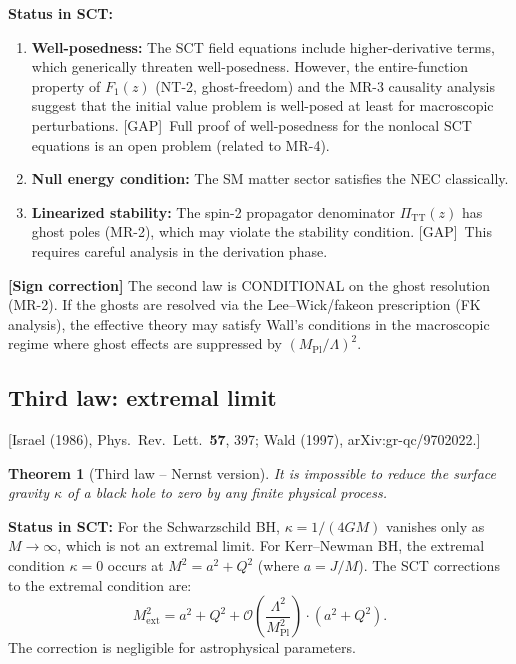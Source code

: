\documentclass[12pt,a4paper]{article}
\newtheorem{theorem}[proposition]{Theorem}
\theoremstyle{definition}
\theoremstyle{remark}
\newcommand{\fromlit}[1]{\textcolor{blue!70!black}{\textsf{[#1]}}}
\newcommand{\gap}{\textcolor{red!80!black}{\textsf{[GAP]}}}
\newcommand{\signcorrection}[1]{%
  \par\noindent\colorbox{red!10}{%
    \parbox{\dimexpr\linewidth-2\fboxsep}{%
      \textcolor{red!50!black}{\textbf{[Sign correction]}}
      \textcolor{red!50!black}{#1}%
    }%
  }\par%
}
\begin{document}
\textbf{Status in SCT:}
\begin{enumerate}[nosep]
  \item \textbf{Well-posedness:} The SCT field equations include
    higher-derivative terms, which generically threaten well-posedness.
    However, the entire-function property of $F_1(z)$
    (NT-2, ghost-freedom) and the MR-3 causality analysis suggest
    that the initial value problem is well-posed at least for
    macroscopic perturbations.  \gap\ Full proof of well-posedness
    for the nonlocal SCT equations is an open problem (related to MR-4).
  \item \textbf{Null energy condition:} The SM matter sector satisfies
    the NEC classically.
  \item \textbf{Linearized stability:} The spin-2 propagator
    denominator $\Pi_{\mathrm{TT}}(z)$ has ghost poles (MR-2),
    which may violate the stability condition.
    \gap\ This requires careful analysis in the derivation phase.
\end{enumerate}

\signcorrection{The second law is CONDITIONAL on the ghost resolution
(MR-2).  If the ghosts are resolved via the Lee--Wick/fakeon
prescription (FK analysis), the effective theory may satisfy Wall's
conditions in the macroscopic regime where ghost effects are
suppressed by $(M_{\mathrm{Pl}}/\Lambda)^2$.}

\subsection{Third law: extremal limit}
\fromlit{Israel (1986), Phys.\ Rev.\ Lett.~\textbf{57}, 397;
Wald (1997), arXiv:gr-qc/9702022.}

\begin{theorem}[Third law -- Nernst version]
It is impossible to reduce the surface gravity $\kappa$ of a black
hole to zero by any finite physical process.
\end{theorem}

\textbf{Status in SCT:} For the Schwarzschild BH, $\kappa = 1/(4GM)$
vanishes only as $M \to \infty$, which is not an extremal limit.
For Kerr--Newman BH, the extremal condition $\kappa = 0$ occurs at
$M^2 = a^2 + Q^2$ (where $a = J/M$).  The SCT corrections to the
extremal condition are:
\begin{equation}
  M_{\mathrm{ext}}^2 = a^2 + Q^2
  + \mathcal{O}\!\left(\frac{\Lambda^2}{M_{\mathrm{Pl}}^2}\right)
  \cdot (a^2 + Q^2).
\end{equation}
The correction is negligible for astrophysical parameters.
\end{document}
